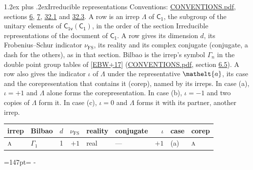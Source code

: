 \documentclass[10pt,a4paper]{article}
\makeatletter
\renewcommand\section{\@startsection{section}{1}{\z@}{-3ex plus -1ex minus -.2ex}%
  {1.2ex plus .2ex}{\normalfont\large\sffamily\bfseries\color{parttitle}}}
\newcommand{\needspace}[1]{\par\penalty-100\begingroup\dimen0=#1\relax\dimen2=\pagegoal
  \advance\dimen2-\pagetotal\ifdim\dimen0>\dimen2\relax\ifdim\dimen2>0pt\vfil\break\fi\fi
  \endgroup}
\numberwithin{equation}{section}
\newcommand{\eltfont}[1]{{\let\sigma\eltsigma\mathelt{#1}}}
\newcommand{\grp}[1]{\mathsf{#1}}
\newcommand{\irr}[1]{\text{\normalfont\scshape #1}}
\newcommand{\elt}[1]{\eltfont{#1}}
\newcommand{\fsind}{\nu_{\mathrm{FS}}}
\makeatother
\begin{document}
\section{Irreducible representations}\label{s:irreps}
Conventions: \href{../../CONVENTIONS.pdf}{CONVENTIONS.pdf}, sections \href{../../../rotation/CONVENTIONS.pdf\#conv.6}{6}, \href{../../../rotation/CONVENTIONS.pdf\#conv.7}{7}, \href{../../CONVENTIONS.pdf\#conv.32.1}{32.1} and \href{../../CONVENTIONS.pdf\#conv.32.3}{32.3}.
\leavevmode\label{n:irrep.Delta}A row is an irrep $\Lambda$ of $\grp{C_{1}}$, the subgroup of the unitary elements of $\grp{C_{1v}}(\grp{C_{1}})$, in the order of the section Irreducible representations of the document of \href{../../../rotation/data/pdf/C1.pdf}{$\grp{C_{1}}$}. \label{n:index.dimension}\label{n:index.frobenius}\label{n:head.irrep}\label{n:head.reality}\label{n:head.conjugate}A row gives its dimension $d$, its Frobenius--Schur indicator $\fsind$, its reality and its complex conjugate (conjugate, a dash for the others), as in that section. \label{n:head.bilbao}\label{n:irrep.alias.gamma}Bilbao is the irrep's symbol $\Gamma_n$ in the double point group tables of [\href{../../../REFERENCES.pdf\#ref.EBW+17}{EBW+17}] (\href{../../CONVENTIONS.pdf}{CONVENTIONS.pdf}, section \href{../../../rotation/CONVENTIONS.pdf\#conv.6.5}{6.5}). \label{n:head.case.corep}\label{n:head.corep}A row also gives the indicator $\iota$ of $\Lambda$ under the representative $\elt{a}$, its case and the corepresentation that contains it (corep), named by its irreps. In case (a), $\iota = +1$ and $\Lambda$ alone forms the corepresentation. In case (b), $\iota = -1$ and two copies of $\Lambda$ form it. In case (c), $\iota = 0$ and $\Lambda$ forms it with its partner, another irrep.
\setlength{\emergencystretch}{2em}\par\setlength{\emergencystretch}{0pt}
{\small\renewcommand{\arraystretch}{1.25}\setlength{\tabcolsep}{4pt}\begin{longtable}{@{}llrrllrll@{}}\toprule
irrep & Bilbao & $d$ & $\fsind$ & reality & conjugate & $\iota$ & case & corep\\\midrule\endhead
\bottomrule\endfoot\endlastfoot
$\irr{a}$ & $\Gamma_{1}$ & 1 & $+1$ & real & --- & $+1$ & (a) & $\irr{a}$\\
\bottomrule\end{longtable}}
\needspace{147pt}
\end{document}
